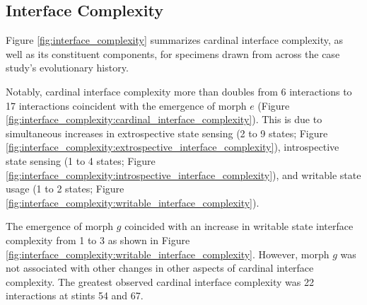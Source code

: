 
\subsection{Interface Complexity}



Figure \ref{fig:interface_complexity} summarizes cardinal interface complexity, as well as its constituent components, for specimens drawn from across the case study's evolutionary history.

Notably, cardinal interface complexity more than doubles from 6 interactions to 17 interactions coincident with the emergence of morph $e$ (Figure \ref{fig:interface_complexity:cardinal_interface_complexity}).
This is due to simultaneous increases in extrospective state sensing (2 to 9 states; Figure \ref{fig:interface_complexity:extrospective_interface_complexity}), introspective state sensing (1 to 4 states; Figure \ref{fig:interface_complexity:introspective_interface_complexity}), and writable state usage (1 to 2 states; Figure \ref{fig:interface_complexity:writable_interface_complexity}).

The emergence of morph $g$ coincided with an increase in writable state interface complexity from 1 to 3 as shown in Figure \ref{fig:interface_complexity:writable_interface_complexity}.
However, morph $g$ was not associated with other changes in other aspects of cardinal interface complexity.
The greatest observed cardinal interface complexity was 22 interactions at stints 54 and 67.
